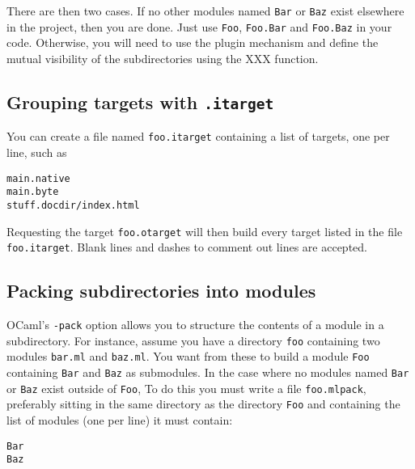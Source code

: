 \documentclass[9pt]{article}
\begin{document}
There are then two cases.  If no other modules named \texttt{Bar} or
\texttt{Baz} exist elsewhere in the project, then you are done.  Just use
\texttt{Foo}, \texttt{Foo.Bar} and \texttt{Foo.Baz} in your code.
Otherwise, you will need to use the plugin mechanism and define the mutual
visibility of the subdirectories using the XXX function.
\subsection{Grouping targets with \texttt{.itarget}}
You can create a file named \texttt{foo.itarget} containing
a list of targets, one per line, such as
\begin{verbatim}
main.native
main.byte
stuff.docdir/index.html
\end{verbatim}
Requesting the target \texttt{foo.otarget} will then build every target
listed in the file \texttt{foo.itarget}.  Blank lines and dashes to comment
out lines are accepted.
\subsection{Packing subdirectories into modules}
OCaml's \texttt{-pack} option allows you to structure the contents of a
module in a subdirectory.  For instance, assume you have a directory
\texttt{foo} containing two modules \texttt{bar.ml} and \texttt{baz.ml}.
You want from these to build a module \texttt{Foo} containing \texttt{Bar}
and \texttt{Baz} as submodules.  In the case where no modules named
\texttt{Bar} or \texttt{Baz} exist outside of \texttt{Foo}, To do this you
must write a file \texttt{foo.mlpack}, preferably sitting in the same
directory as the directory \texttt{Foo} and containing the list of modules
(one per line) it must contain:
\begin{verbatim}
Bar
Baz
\end{verbatim}
\end{document}
